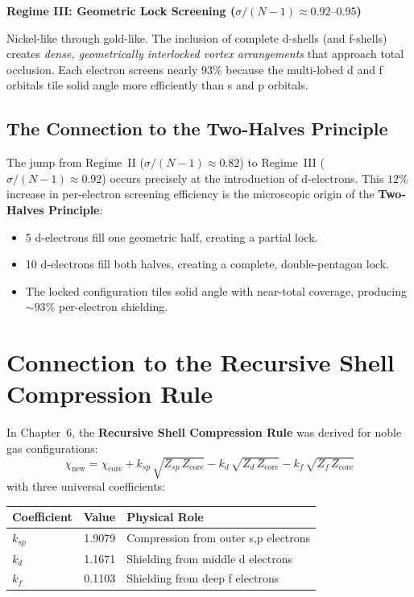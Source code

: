 \textbf{Regime III: Geometric Lock Screening ($\sigma/(N{-}1) \approx 0.92\text{--}0.95$)}

Nickel-like through gold-like.  The inclusion of complete d-shells (and f-shells) creates \emph{dense, geometrically interlocked vortex arrangements} that approach total occlusion.  Each electron screens nearly $93\%$ because the multi-lobed d and f orbitals tile solid angle more efficiently than s and p orbitals.

\subsection{The Connection to the Two-Halves Principle}

The jump from Regime~II ($\sigma/(N{-}1) \approx 0.82$) to Regime~III ($\sigma/(N{-}1) \approx 0.92$) occurs precisely at the introduction of d-electrons.  This $12\%$ increase in per-electron screening efficiency is the microscopic origin of the \textbf{Two-Halves Principle}:

\begin{itemize}
  \item 5 d-electrons fill one geometric half, creating a partial lock.
  \item 10 d-electrons fill both halves, creating a complete, double-pentagon lock.
  \item The locked configuration tiles solid angle with near-total coverage, producing $\sim 93\%$ per-electron shielding.
\end{itemize}


\section{Connection to the Recursive Shell Compression Rule}

In Chapter~6, the \textbf{Recursive Shell Compression Rule} was derived for noble gas configurations:
\begin{equation}\label{eq:chi-recursive}
  \chi_{\text{new}} = \chi_{\text{core}} + k_{sp}\,\sqrt{Z_{sp}\,Z_{\text{core}}} - k_d\,\sqrt{Z_d\,Z_{\text{core}}} - k_f\,\sqrt{Z_f\,Z_{\text{core}}}
\end{equation}
with three universal coefficients:
\begin{center}
\begin{tabular}{lrl}
\hline
\textbf{Coefficient} & \textbf{Value} & \textbf{Physical Role} \\
\hline
$k_{sp}$ & 1.9079 & Compression from outer s,p electrons \\
$k_d$    & 1.1671 & Shielding from middle d electrons \\
$k_f$    & 0.1103 & Shielding from deep f electrons \\
\hline
\end{tabular}
\end{center}

